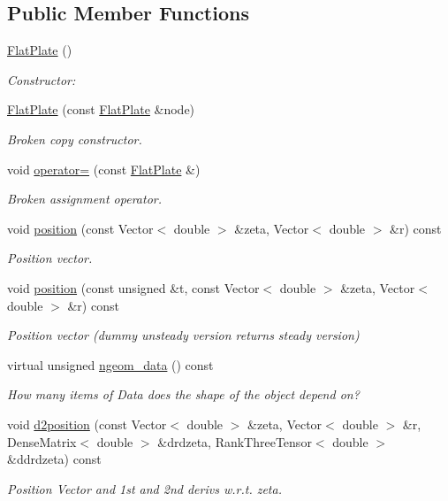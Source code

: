 \subsection*{Public Member Functions}
\begin{DoxyCompactItemize}
\item 
\hyperlink{classFlatPlate_a5a0e45f57f8d40885e220349aa1beaa6}{Flat\+Plate} ()
\begin{DoxyCompactList}\small\item\em Constructor\+: \end{DoxyCompactList}\item 
\hyperlink{classFlatPlate_a8d235775f64d0241d8111d3a743e1b49}{Flat\+Plate} (const \hyperlink{classFlatPlate}{Flat\+Plate} \&node)
\begin{DoxyCompactList}\small\item\em Broken copy constructor. \end{DoxyCompactList}\item 
void \hyperlink{classFlatPlate_af1ecfd0cc5b23be30488c8493ada6b2d}{operator=} (const \hyperlink{classFlatPlate}{Flat\+Plate} \&)
\begin{DoxyCompactList}\small\item\em Broken assignment operator. \end{DoxyCompactList}\item 
void \hyperlink{classFlatPlate_a4a8965c0578bbce8e56f174ae4590012}{position} (const Vector$<$ double $>$ \&zeta, Vector$<$ double $>$ \&r) const
\begin{DoxyCompactList}\small\item\em Position vector. \end{DoxyCompactList}\item 
void \hyperlink{classFlatPlate_ae5e3e3fcf6b8c412865a02a27aeeeaf0}{position} (const unsigned \&t, const Vector$<$ double $>$ \&zeta, Vector$<$ double $>$ \&r) const
\begin{DoxyCompactList}\small\item\em Position vector (dummy unsteady version returns steady version) \end{DoxyCompactList}\item 
virtual unsigned \hyperlink{classFlatPlate_ae7132e6fbbabf5543df743024b2ba9f7}{ngeom\+\_\+data} () const
\begin{DoxyCompactList}\small\item\em How many items of Data does the shape of the object depend on? \end{DoxyCompactList}\item 
void \hyperlink{classFlatPlate_a2c14c32689795ee19c5dfeb0026c5ec0}{d2position} (const Vector$<$ double $>$ \&zeta, Vector$<$ double $>$ \&r, Dense\+Matrix$<$ double $>$ \&drdzeta, Rank\+Three\+Tensor$<$ double $>$ \&ddrdzeta) const
\begin{DoxyCompactList}\small\item\em Position Vector and 1st and 2nd derivs w.\+r.\+t. zeta. \end{DoxyCompactList}\end{DoxyCompactItemize}



